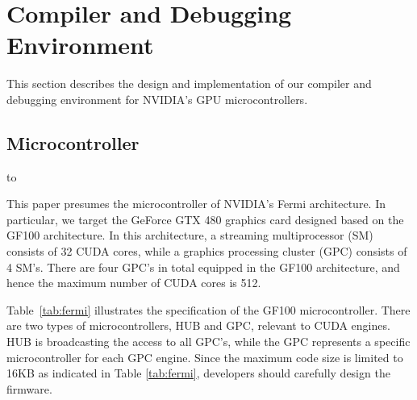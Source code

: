 
\section{Compiler and Debugging Environment}\label{sec:design}

This section describes the design and implementation of our compiler and
debugging environment for NVIDIA's GPU microcontrollers.

\subsection{Microcontroller}

\begin{table}[tb]
\caption{Specification of GF100 microcontroller.} 
\label{tab:fermi}
\hbox to
\end{table}

This paper presumes the microcontroller of NVIDIA's Fermi architecture.
In particular, we target the GeForce GTX 480 graphics card designed
based on the GF100 architecture.
In this architecture, a streaming multiprocessor (SM) consists of
32 CUDA cores, while a graphics processing cluster (GPC) consists of 4
SM's.
There are four GPC's in total equipped in the GF100 architecture, and
hence the maximum number of CUDA cores is 512.

Table~\ref{tab:fermi} illustrates the specification of the GF100
microcontroller.
There are two types of microcontrollers, HUB and GPC, relevant to CUDA
engines.
HUB is broadcasting the access to all GPC's, while the GPC represents a
specific microcontroller for each GPC engine.
Since the maximum code size is limited to 16KB as indicated in Table
\ref{tab:fermi}, developers should carefully design the firmware.

